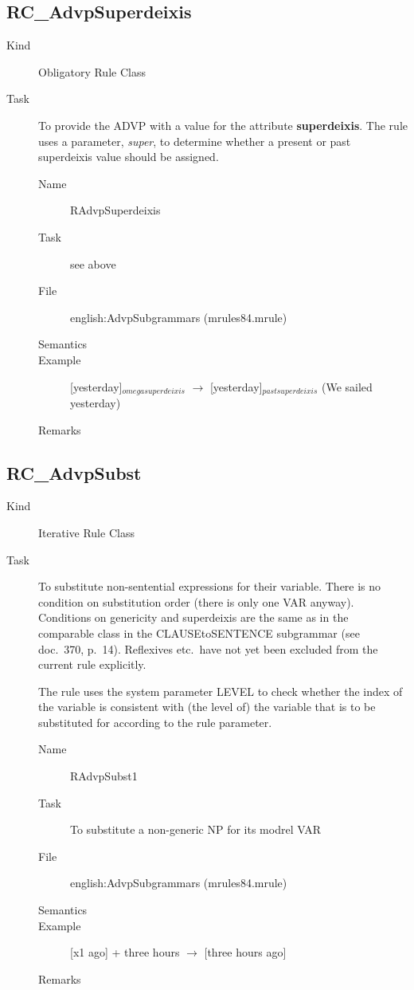 \subsection{RC\_AdvpSuperdeixis}
\begin{description}
\item[Kind] Obligatory Rule Class
\item[Task] To provide the ADVP with a value for the attribute {\bf 
superdeixis}. The rule uses a 
parameter, {\em super\/}, to determine whether a present or past superdeixis 
value should be assigned.

\vspace{1 cm}
\begin{description}
\item[Name] RAdvpSuperdeixis
\item[Task] see above
\item[File] english:AdvpSubgrammars (mrules84.mrule)
\item[Semantics]
\item[Example] [yesterday]$_{omegasuperdeixis}$ $\rightarrow$ 
[yesterday]$_{pastsuperdeixis}$ (We sailed yesterday)
\item[Remarks]
\end{description}

\end{description}

\newpage
\subsection{RC\_AdvpSubst}
\begin{description}
\item[Kind] Iterative Rule Class
\item[Task] To substitute non-sentential expressions for their variable. There 
is no condition on substitution order (there is only one VAR anyway).
Conditions on genericity and superdeixis are the same as in the comparable 
class in the CLAUSEtoSENTENCE subgrammar (see doc.\ 370, p.\ 14). Reflexives 
etc.\ have not yet been excluded from the current rule explicitly. 

The rule uses the system parameter LEVEL to check whether the index of the 
variable is consistent with (the level of) the variable that is to be 
substituted for according to the rule parameter.

\vspace{1 cm}
\begin{description}
\item[Name] RAdvpSubst1
\item[Task] To substitute a non-generic NP for its modrel VAR
\item[File] english:AdvpSubgrammars (mrules84.mrule)
\item[Semantics]
\item[Example] [x1 ago] + three hours $\rightarrow$ [three hours ago]
\item[Remarks]
\end{description}

\end{description}





